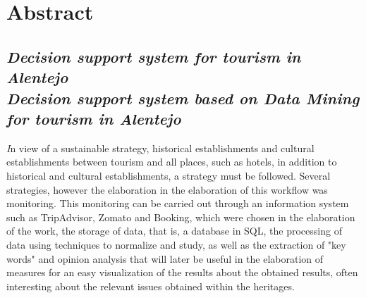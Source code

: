 \chapter{Abstract}
\section*{\textit{Decision support system for tourism in Alentejo}\\  {\small{\textit{Decision support system based on Data Mining for tourism in Alentejo}}}}

\textit
In view of a sustainable strategy, historical establishments and cultural establishments between tourism and all places, such as hotels, in addition to historical and cultural establishments, a strategy must be followed. Several strategies, however the elaboration in the elaboration of this workflow was monitoring. This monitoring can be carried out through an information system such as TripAdvisor, Zomato and Booking, which were chosen in the elaboration of the work, the storage of data, that is, a database in SQL, the processing of data using techniques to normalize and study, as well as the extraction of "key words" and opinion analysis that will later be useful in the elaboration of measures for an easy visualization of the results about the obtained results, often interesting about the relevant issues obtained within the heritages.

